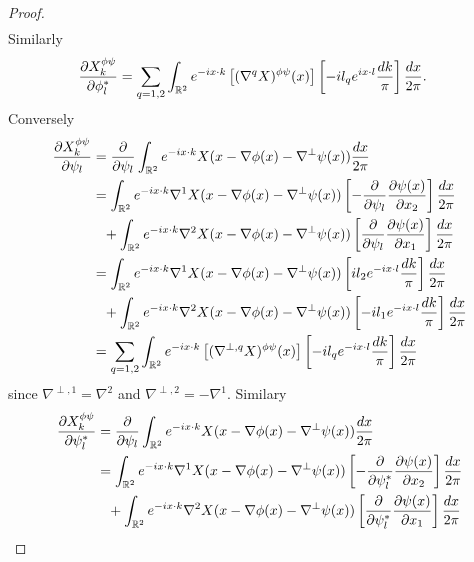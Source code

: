\documentclass[noinfoline]{imsart}
\begin{document}
\begin{proof}
\begin{align}
\end{align}
Similarly
\begin{align}
\frac{\partial X^{\phi\psi}_k }{\partial \phi^*_l }
&= \sum_{q=1,2}  \int_{\Bbb R^2} e^{-ix \cdot k} \left[(\nabla^q X)^{\phi\psi}(x)\right]\left[  -i  l_q e^{i x \cdot l}\frac{dk}{\pi} \right]\frac{dx}{2\pi}.
\end{align}
Conversely
\begin{align}
\nonumber \frac{\partial X^{\phi\psi}_k}{\partial \psi_{ l} }
&=  \frac{\partial}{\partial  \psi_{ l} } \int_{\Bbb R^2}  e^{-ix \cdot k} X(x-\nabla \phi(x)-\nabla^\perp \psi(x))\frac{dx}{2\pi} \\
\nonumber &=  \int_{\Bbb R^2} e^{-ix \cdot k} \nabla^1 X(x-\nabla \phi(x)-\nabla^\perp\psi(x))\left[- \frac{\partial}{\partial \psi_{l}}\frac{\partial\psi(x)}{\partial x_2}\right]\frac{dx}{2\pi}\\
 &\phantom{=}  +\int_{\Bbb R^2} e^{-ix \cdot k} \nabla^2 X(x-\nabla \phi(x)-\nabla^\perp\psi(x))\left[ \frac{\partial}{\partial \psi_{l}}\frac{\partial\psi(x)}{\partial x_1}\right]\frac{dx}{2\pi}\\
 \nonumber &=  \int_{\Bbb R^2} e^{-ix \cdot k} \nabla^1 X(x-\nabla \phi(x)-\nabla^\perp\psi(x))\left[ i  l_2 e^{-i x \cdot l} \frac{dk}{\pi}\right]\frac{dx}{2\pi}\\
 &\phantom{=}  +\int_{\Bbb R^2} e^{-ix \cdot k} \nabla^2 X(x-\nabla \phi(x)-\nabla^\perp\psi(x))\left[-  i  l_1 e^{-i x \cdot l} \frac{dk}{\pi}\right]\frac{dx}{2\pi} \\
 \nonumber &= \sum_{q=1,2}  \int_{\Bbb R^2} e^{-ix \cdot k} \left[(\nabla^{\perp,q} X)^{\phi\psi}(x)\right]\left[ - i  l_q e^{-i x \cdot l} \frac{dk}{\pi}\right]\frac{dx}{2\pi}
\end{align}
since $\nabla^{\perp,1}=\nabla^2$ and $\nabla^{\perp,2}=-\nabla^1$. Similary
\begin{align}
\nonumber \frac{\partial X^{\phi\psi}_k}{\partial \psi^*_{ l} }
&=  \frac{\partial}{\partial  \psi_{ l} } \int_{\Bbb R^2}  e^{-ix \cdot k} X(x-\nabla \phi(x)-\nabla^\perp \psi(x))\frac{dx}{2\pi} \\
\nonumber &=  \int_{\Bbb R^2} e^{-ix \cdot k} \nabla^1 X(x-\nabla \phi(x)-\nabla^\perp\psi(x))\left[- \frac{\partial}{\partial \psi^*_{l}}\frac{\partial\psi(x)}{\partial x_2}\right]\frac{dx}{2\pi}\\
 &\phantom{=}  +\int_{\Bbb R^2} e^{-ix \cdot k} \nabla^2 X(x-\nabla \phi(x)-\nabla^\perp\psi(x))\left[ \frac{\partial}{\partial \psi^*_{l}}\frac{\partial\psi(x)}{\partial x_1}\right]\frac{dx}{2\pi}\\

\end{align}
\end{proof}
\end{document}
